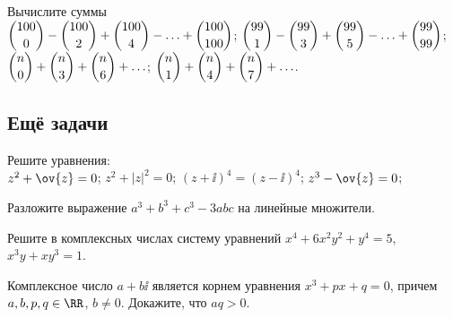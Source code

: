 \begin{problems}

\item
Вычислите суммы
\\[1ex]
\sbp
\(
    \dbinom{100}{0} - \dbinom{100}{2} + \dbinom{100}{4}
    - \ldots +
    \dbinom{100}{100}
\);
\quad
\sbp
\(
    \dbinom{99}{1} - \dbinom{99}{3} + \dbinom{99}{5}
    - \ldots +
    \dbinom{99}{99}
\);
\\[1ex]
\sbp
\(
    \dbinom{n}{0} + \dbinom{n}{3} + \dbinom{n}{6}
    + \ldots
\);
\quad
\sbp
\(
    \dbinom{n}{1} + \dbinom{n}{4} + \dbinom{n}{7} + \ldots
\).

\end{problems}


\subsection*{Ещё задачи}

\begin{problems}

\item
Решите уравнения:
\\
\sbp $z^2 + \ov{z} = 0$;
\quad
\sbp $z^2 + |z|^2 = 0$;
\quad
\sbp $(z + \ii)^4 = (z - \ii)^4$;
\quad
\sbp $z^3 - \ov{z} = 0$;

\item
Разложите выражение $a^3 + b^3 + c^3 - 3 a b c$ на линейные множители.

\item
Решите в комплексных числах систему уравнений
$x^4 + 6 x^2 y^2 + y^4 = 5$,
$x^3 y + x y^3 = 1$.

\item
Комплексное число $a + b \ii$ является корнем уравнения $x^3 + p x + q = 0$,
причем $a, b, p, q \in \RR$, $b \neq 0$.
Докажите, что $a q > 0$.

\end{problems}

